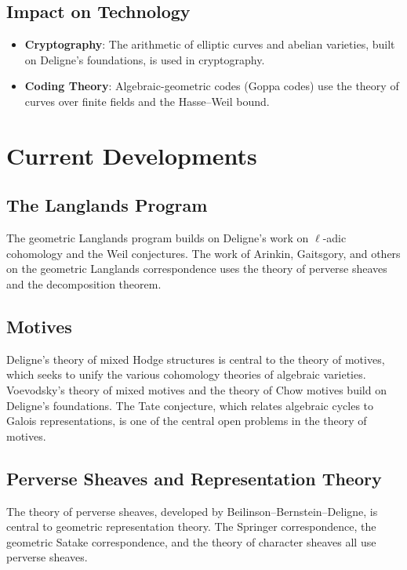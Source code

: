\subsection{Impact on Technology}

\begin{itemize}
\item \textbf{Cryptography}: The arithmetic of elliptic curves and abelian varieties, built on Deligne's foundations, is used in cryptography.
\item \textbf{Coding Theory}: Algebraic-geometric codes (Goppa codes) use the theory of curves over finite fields and the Hasse--Weil bound.
\end{itemize}

\section{Current Developments}

\subsection{The Langlands Program}

The geometric Langlands program builds on Deligne's work on $\ell$-adic cohomology and the Weil conjectures. The work of Arinkin, Gaitsgory, and others on the geometric Langlands correspondence uses the theory of perverse sheaves and the decomposition theorem.

\subsection{Motives}

Deligne's theory of mixed Hodge structures is central to the theory of motives, which seeks to unify the various cohomology theories of algebraic varieties. Voevodsky's theory of mixed motives and the theory of Chow motives build on Deligne's foundations. The Tate conjecture, which relates algebraic cycles to Galois representations, is one of the central open problems in the theory of motives.

\subsection{Perverse Sheaves and Representation Theory}

The theory of perverse sheaves, developed by Beilinson--Bernstein--Deligne, is central to geometric representation theory. The Springer correspondence, the geometric Satake correspondence, and the theory of character sheaves all use perverse sheaves.

